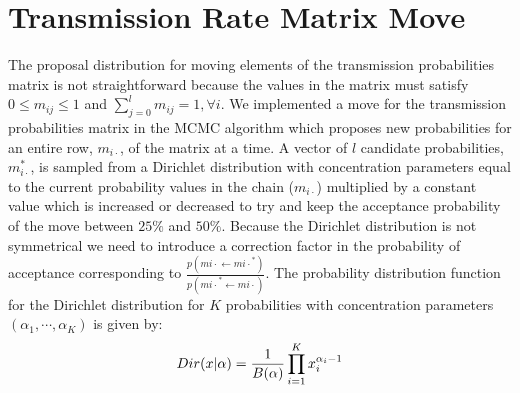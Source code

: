 \documentclass[11pt,a4paper]{report}
\begin{document}
\section{Transmission Rate Matrix Move}
The proposal distribution for moving elements of the transmission probabilities matrix is not straightforward because the values in the matrix must satisfy $0 \leq m_{ij} \leq 1$ and $\sum^{l}_{j=0} m_{ij} = 1, \forall i$. We implemented a move for the transmission probabilities matrix in the MCMC algorithm which proposes new probabilities for an entire row, $m_{i \cdot}$, of the matrix at a time. A vector of $l$ candidate probabilities, $m_{i \cdot}^{*}$, is sampled from a Dirichlet distribution with concentration parameters equal to the current probability values in the chain ($m_{i \cdot}$) multiplied by a constant value which is increased or decreased to try and keep the acceptance probability of the move between $25\%$ and $50\%$. Because the Dirichlet distribution is not symmetrical we need to introduce a correction factor in the probability of acceptance corresponding to $\frac{p(m{i \cdot}\leftarrow m{i \cdot}^*)}{p(m{i \cdot}^* \leftarrow m{i \cdot})}$. The probability distribution function for the Dirichlet distribution for $K$ probabilities with concentration parameters $(\alpha_1,\cdots,\alpha_K)$ is given by:
\begin{equation}
Dir(x|\alpha) = \frac{1}{B( {\bf \alpha} )}\prod_{i=1}^{K} x_{i}^{\alpha_{i} - 1}
\end{equation}
\end{document}
